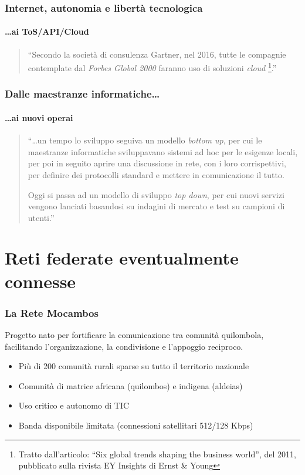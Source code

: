 \documentclass{beamer}
\begin{document}
\begin{frame}
  \frametitle{Internet, autonomia e libertà tecnologica}
  \framesubtitle{\ldots ai ToS/API/Cloud}
  \begin{quote}
    ``Secondo la società di consulenza Gartner, nel 2016, tutte le
    compagnie contemplate dal \emph{Forbes Global 2000} faranno uso di
    soluzioni \emph{cloud} \footnote{Tratto dall'articolo: ``Six global trends
      shaping the business world'', del 2011, pubblicato sulla rivista EY
      Insights di Ernst \& Young}.''
  \end{quote}
\end{frame}

\begin{frame}
  \frametitle{Dalle maestranze informatiche\ldots}
  \framesubtitle{\ldots ai nuovi operai}
  \begin{quotation}
    ``\ldots un tempo lo sviluppo seguiva un modello \emph{bottom up}, per
    cui le maestranze informatiche sviluppavano sistemi ad hoc per le
    esigenze locali, per poi in seguito aprire una discussione in
    rete, con i loro corrispettivi, per definire dei protocolli
    standard e mettere in comunicazione il tutto.

    Oggi si passa ad un modello di sviluppo \emph{top down}, per cui
    nuovi servizi vengono lanciati basandosi su indagini di mercato e
    test su campioni di utenti.''
  \end{quotation}
\end{frame}


\section{Reti federate eventualmente connesse}

{

\begin{frame}
  \frametitle{La Rete Mocambos}
  Progetto nato per fortificare la comunicazione tra comunità quilombola,
  facilitando l'organizzazione, la condivisione e l'appoggio reciproco.
  \begin{itemize}
    \item Più di 200 comunità rurali sparse su tutto il territorio
      nazionale
    \item Comunità di matrice africana (quilombos) e indigena (aldeias)
    \item Uso critico e autonomo di TIC
    \item Banda disponibile limitata (connessioni satellitari 512/128 Kbps)
    \end{itemize}
\end{frame}
}
\end{document}
